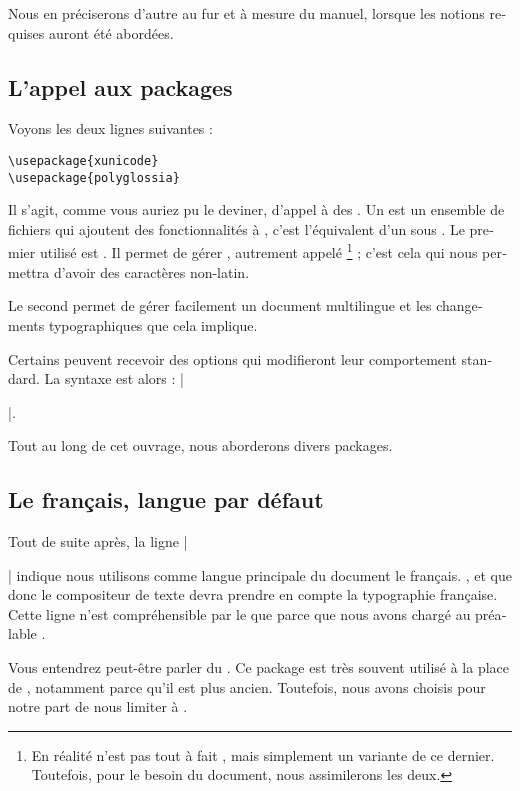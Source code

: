 Nous en préciserons d'autre au fur et à mesure du manuel, lorsque les notions requises auront été abordées.

\subsection{L'appel aux packages}

Voyons les deux lignes suivantes : 
\begin{verbatim}
\usepackage{xunicode}
\usepackage{polyglossia}
\end{verbatim}

Il s'agit, comme vous auriez pu le deviner, d'appel à des . Un  est un ensemble de fichiers qui ajoutent des fonctionnalités à , c'est l'équivalent d'un  sous . Le premier  utilisé est . Il permet de gérer , autrement appelé \footnote{En réalité  n'est pas tout à fait , mais simplement un variante de ce dernier. Toutefois, pour le besoin du document, nous assimilerons les deux.} ; c'est cela qui nous permettra d'avoir des caractères non-latin.

Le second permet de gérer facilement un document multilingue et les changements typographiques que cela implique.

Certains  peuvent recevoir des options qui modifieront leur comportement standard. La syntaxe est alors : |\usepackage[options]{package}|. 

Tout au long de cet ouvrage, nous aborderons divers packages.

\subsection{Le fran\c cais, langue par défaut}

Tout de suite après, la ligne |\setmainlanguage{french}| indique nous utilisons comme langue principale du document le fran\c cais. , et que donc le compositeur de texte devra prendre en compte la typographie fran\c caise. Cette ligne n'est compréhensible par le  que parce que nous avons chargé au préalable .

\begin{anedocte}
Vous entendrez peut-être parler du  . Ce package est très souvent utilisé à la place de , notamment parce qu'il est plus ancien. Toutefois, nous avons choisis pour notre part de nous limiter à .
\end{anedocte}
